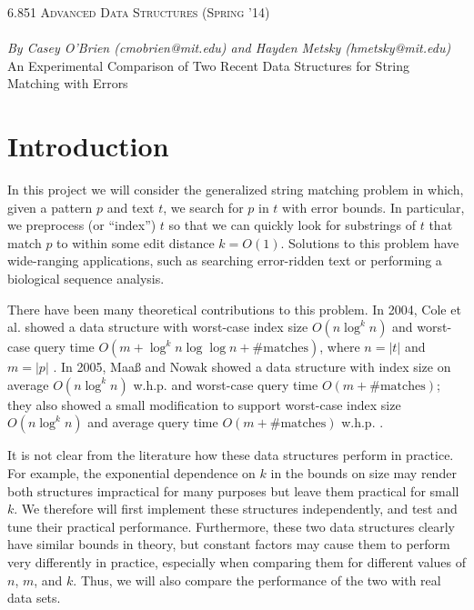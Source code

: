 \documentclass[11pt]{article}
\begin{document}
\begin{center} \Large
{\scshape 6.851 Advanced Data Structures (Spring '14)} \\[1ex]
 \\[1ex]
{\large \em By Casey O'Brien (cmobrien@mit.edu) and Hayden Metsky (hmetsky@mit.edu)} \\[2ex]
An Experimental Comparison of Two Recent Data Structures for String Matching with Errors
\end{center}

\section{Introduction}

In this project we will consider the generalized string matching problem in which, given a pattern $p$ and text $t$, we search for $p$ in $t$ with error bounds.
In particular, we preprocess (or ``index'') $t$ so that we can quickly look for substrings of $t$ that match $p$ to within some edit distance $k = O(1)$.
Solutions to this problem have wide-ranging applications, such as searching error-ridden text or performing a biological sequence analysis.

There have been many theoretical contributions to this problem.
In 2004, Cole et al. showed a data structure with worst-case index size $O(n \log^k n)$ and worst-case query time $O(m + \log^k n \log \log n + \text{\# matches})$, where $n = |t|$ and $m = |p|$ \cite{cole}.
In 2005, Maa{\ss} and Nowak showed a data structure with index size on average $O(n \log^k n)$ w.h.p. and worst-case query time $O(m + \text{\# matches})$; they also showed a small modification to support worst-case index size $O(n \log^k n)$ and average query time $O(m + \text{\# matches})$ w.h.p. \cite{maas}.

It is not clear from the literature how these data structures perform in practice.
For example, the exponential dependence on $k$ in the bounds on size may render both structures impractical for many purposes but leave them practical for small $k$.
We therefore will first implement these structures independently, and test and tune their practical performance.
Furthermore, these two data structures clearly have similar bounds in theory, but constant factors may cause them to perform very differently in practice, especially when comparing them for different values of $n$, $m$, and $k$.
Thus, we will also compare the performance of the two with real data sets.
\end{document}
